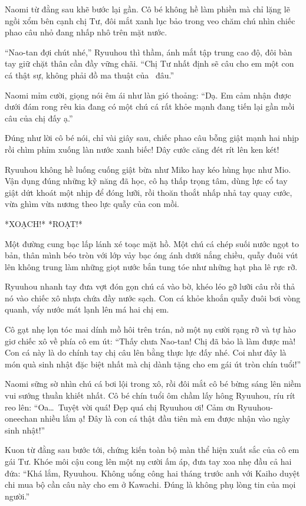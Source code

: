 \documentclass[../main.tex]{subfiles}
\begin{document}
Naomi từ đằng sau khẽ bước lại gần. Cô bé không hề làm phiền mà chỉ lặng lẽ ngồi xổm bên cạnh chị Tư, đôi mắt xanh lục bảo trong veo chăm chú nhìn chiếc phao câu nhỏ đang nhấp nhô trên mặt nước.

``Nao-tan đợi chút nhé,'' Ryuuhou thì thầm, ánh mắt tập trung cao độ, đôi bàn tay giữ chặt thân cần đầy vững chãi. ``Chị Tư nhất định sẽ câu cho em một con cá thật sự, không phải đồ ma thuật của \hll\ đâu.''

Naomi mỉm cười, giọng nói êm ái như làn gió thoảng: ``Dạ. Em cảm nhận được dưới đám rong rêu kia đang có một chú cá rất khỏe mạnh đang tiến lại gần mồi câu của chị đấy ạ.''

Đúng như lời cô bé nói, chỉ vài giây sau, chiếc phao câu bỗng giật mạnh hai nhịp rồi chìm phỉm xuống làn nước xanh biếc! Dây cước căng đét rít lên ken két!

Ryuuhou không hề luống cuống giật bừa như Miko hay kéo hùng hục như Mio. Vận dụng đúng những kỹ năng đã học, cô hạ thấp trọng tâm, dùng lực cổ tay giật dứt khoát một nhịp để đóng lưỡi, rồi thoăn thoắt nhấp nhả tay quay cước, vừa ghìm vừa nương theo lực quẫy của con mồi.

*XOẠCH!* *ROẠT!*

Một đường cung bạc lấp lánh xé toạc mặt hồ. Một chú cá chép suối nước ngọt to bản, thân mình béo tròn với lớp vảy bạc óng ánh dưới nắng chiều, quẫy đuôi vút lên không trung làm những giọt nước bắn tung tóe như những hạt pha lê rực rỡ.

Ryuuhou nhanh tay đưa vợt đón gọn chú cá vào bờ, khéo léo gỡ lưỡi câu rồi thả nó vào chiếc xô nhựa chứa đầy nước sạch. Con cá khỏe khoắn quẫy đuôi bơi vòng quanh, vẩy nước mát lạnh lên má hai chị em.

Cô gạt nhẹ lọn tóc mai dính mồ hôi trên trán, nở một nụ cười rạng rỡ và tự hào giơ chiếc xô về phía cô em út: ``Thấy chưa Nao-tan! Chị đã bảo là làm được mà! Con cá này là do chính tay chị câu lên bằng thực lực đấy nhé. Coi như đây là món quà sinh nhật đặc biệt nhất mà chị dành tặng cho em gái út tròn chín tuổi!''

Naomi sững sờ nhìn chú cá bơi lội trong xô, rồi đôi mắt cô bé bừng sáng lên niềm vui sướng thuần khiết nhất. Cô bé chín tuổi ôm chầm lấy hông Ryuuhou, ríu rít reo lên: ``Oa\dots\ Tuyệt vời quá! Đẹp quá chị Ryuuhou ơi! Cảm ơn Ryuuhou-oneechan nhiều lắm ạ! Đây là con cá thật đầu tiên mà em được nhận vào ngày sinh nhật!''

Kuon từ đằng sau bước tới, chứng kiến toàn bộ màn thể hiện xuất sắc của cô em gái Tư. Khóe môi cậu cong lên một nụ cười ấm áp, đưa tay xoa nhẹ đầu cả hai đứa: ``Khá lắm, Ryuuhou. Không uổng công hai tháng trước anh với Kaiho duyệt chi mua bộ cần câu này cho em ở Kawachi. Đúng là không phụ lòng tin của mọi người.''
\end{document}
